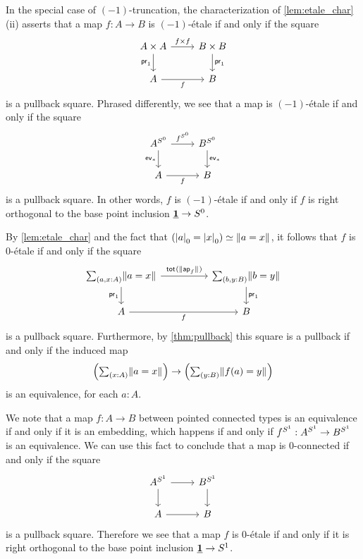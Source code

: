 \documentclass[9pt,twosided]{amsart}
\begin{document}
\begin{eg}\label{rmk:-1etale}
In the special case of $(-1)$-truncation, the characterization of \cref{lem:etale_char} (ii) asserts that a map $f:A\to B$ is $(-1)$-\'etale if and only if the square
\begin{equation*}
\begin{tikzcd}
A\times A \arrow[d,swap,"\proj 1"] \arrow[r,"{f\times f}"] & B\times B \arrow[d,"\proj 1"] \\
A \arrow[r,swap,"f"] & B
\end{tikzcd}
\end{equation*}
is a pullback square. Phrased differently, we see that a map is $(-1)$-\'etale if and only if the square
\begin{equation*}
\begin{tikzcd}
A^{\sphere{0}} \arrow[d,swap,"\mathsf{ev}_\ast"] \arrow[r,"f^{\sphere{0}}"] & B^{\sphere{0}} \arrow[d,"\mathsf{ev}_\ast"] \\
A \arrow[r,swap,"f"] & B
\end{tikzcd}
\end{equation*}
is a pullback square. In other words, $f$ is $(-1)$-\'etale if and only if $f$ is right orthogonal to the base point inclusion $\underline{\mathbf{1}}\to S^{0}$. 
\end{eg}

\begin{eg}
By \cref{lem:etale_char} and the fact that $\eqv{(\tproj{0}{a}=\tproj{0}{x})}{\brck{a=x}}$, it follows that $f$ is $0$-\'etale if and only if the square
\begin{equation*}
\begin{tikzcd}[column sep=huge]
\sm{a,x:A}\brck{a=x} \arrow[d,swap,"\proj 1"] \arrow[r,"\total{\brck{\apfunc{f}}}"] & \sm{b,y:B}\brck{b=y} \arrow[d,"\proj 1"] \\
A \arrow[r,swap,"f"] & B
\end{tikzcd}
\end{equation*}
is a pullback square. Furthermore, by \cref{thm:pullback} this square is a pullback if and only if the induced map
\begin{equation*}
\Big(\sm{x:A}\brck{a=x}\Big)\to\Big(\sm{y:B}\brck{f(a)=y}\Big)
\end{equation*}
is an equivalence, for each $a:A$.

We note that a map $f:A\to B$ between pointed connected types is an equivalence if and only if it is an embedding, which happens if and only if $f^{S^{1}}:A^{S^{1}} \to B^{S^{1}}$ is an equivalence. We can use this fact to conclude that a map is $0$-connected if and only if the square
\begin{equation*}
  \begin{tikzcd}
    A^{\sphere{1}} \arrow[r] \arrow[d] & B^{\sphere{1}} \arrow[d] \\
    A \arrow[r] & B
  \end{tikzcd}
\end{equation*}
is a pullback square. Therefore we see that a map $f$ is $0$-\'etale if and only if it is right orthogonal to the base point inclusion $\underline{\mathbf{1}}\to S^{1}$.
\end{eg}
\end{document}
